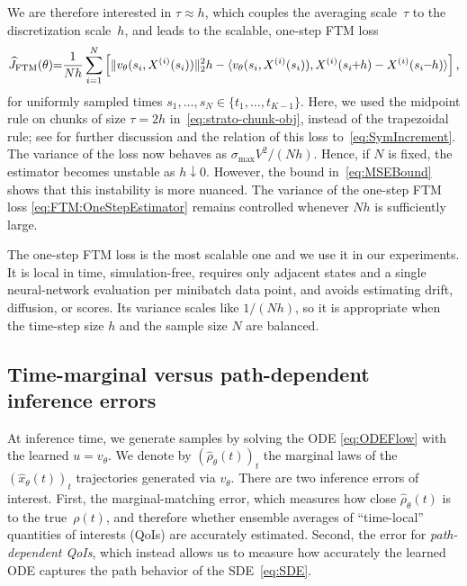 \documentclass[oneside,11pt]{article}
\theoremstyle{remark}
\begin{document}
We are therefore interested in  $\tau \approx h$, which couples the averaging scale~$\tau$ to the discretization scale~$h$, and leads to the scalable, one-step FTM loss
\begin{equation}\label{eq:FTM:OneStepEstimator}
\widehat{J}_{\text{FTM}}(\theta)\hspace*{-0.10cm} = \hspace*{-0.10cm}\frac{1}{Nh}\sum_{i = 1}^N\left[\|v_{\theta}(s_i, X^{(i)}(s_i))\|_2^2h - \langle v_{\theta}(s_i,X^{(i)}(s_i)), X^{(i)}(s_{i}\hspace*{-0.10cm}+\hspace*{-0.10cm}h) - X^{(i)}(s_i\hspace*{-0.10cm}-\hspace*{-0.10cm}h)\rangle\right],
\end{equation}
for uniformly sampled times $s_1, \dots, s_N \in \{t_1, \dots, t_{K-1}\}$. Here, we used the midpoint rule on chunks of size $\tau = 2h$ in~\eqref{eq:strato-chunk-obj}, instead of the trapezoidal rule; see  for further discussion and the relation of this loss to~\eqref{eq:SymIncrement}. 
The variance of the loss now behaves as $\sigma_{\max}V^2/(Nh)$. Hence, if $N$ is fixed, the estimator becomes unstable as $h \downarrow 0$. However, the bound in~\eqref{eq:MSEBound} shows that this instability is more nuanced. The variance of the one-step FTM loss \eqref{eq:FTM:OneStepEstimator} remains controlled whenever $Nh$ is sufficiently large. 

The one-step FTM loss is the most scalable one and we use it in our experiments. It is local in time, simulation-free, requires only adjacent states and a single neural-network evaluation per minibatch data point, and avoids estimating drift, diffusion, or scores. Its variance scales like $1/(Nh)$, so it is appropriate when the time-step size $h$ and the sample size $N$ are balanced. 






\subsection{Time-marginal versus path-dependent inference errors}
At inference time, we generate samples by solving the ODE \eqref{eq:ODEFlow} with the learned $u = v_{\theta}$. We denote by $(\hat{\rho}_\theta(t))_t$ the marginal laws of the $(\hat{x}_\theta(t))_t$ trajectories generated via $v_\theta$. There are two inference errors of interest. 
First, the marginal-matching error, which measures how close  $\hat{\rho}_\theta(t)$  is to the true~$\rho(t)$, and therefore whether ensemble averages of ``time-local'' quantities of interests (QoIs) are accurately estimated. 
Second, the error for \textit{path-dependent QoIs}, which instead allows us to measure how accurately the learned ODE captures the path behavior of the SDE~\eqref{eq:SDE}.
\end{document}
